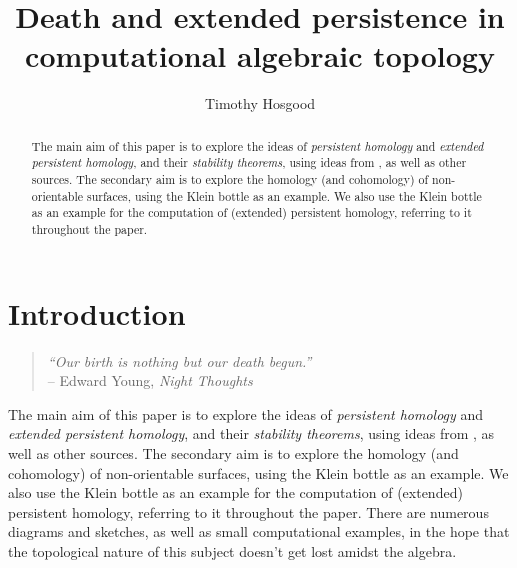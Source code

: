 \documentclass[12pt]{article}
\title{\vspace{-1em}Death and extended persistence in computational algebraic topology}
\author{Timothy Hosgood}
\numberwithin{equation}{subsection}
\numberwithin{theorem}{subsection}
\numberwithin{lemma}{subsection}
\numberwithin{corollary}{subsection}
\numberwithin{definition}{subsection}
\numberwithin{example}{subsection}
\numberwithin{note}{subsection}
\begin{document}

    \maketitle

    \begin{abstract}
        \small
        The main aim of this paper is to explore the ideas of \emph{persistent homology} and \emph{extended persistent homology}, and their \emph{stability theorems}, using ideas from \cite{CohenSteiner:2009ho,CohenSteiner:2007is,Bubenik:dn}, as well as other sources.
        The secondary aim is to explore the homology (and cohomology) of non-orientable surfaces, using the Klein bottle as an example.
        We also use the Klein bottle as an example for the computation of (extended) persistent homology, referring to it throughout the paper.
    \end{abstract}
    
    \renewcommand{\abstractname}{Contents}
    \begin{abstract}
        \noindent\vspace{-2em}\tableofcontents
    \end{abstract}

    \section{Introduction} %
    \label{sec:introduction}

        \begin{quotation}
            \raggedleft
            \emph{``Our birth is nothing but our death begun.''}\\
            -- Edward Young, \emph{Night Thoughts}
        \end{quotation}

        The main aim of this paper is to explore the ideas of \emph{persistent homology} and \emph{extended persistent homology}, and their \emph{stability theorems}, using ideas from \cite{CohenSteiner:2009ho,CohenSteiner:2007is,Bubenik:dn}, as well as other sources.
        The secondary aim is to explore the homology (and cohomology) of non-orientable surfaces, using the Klein bottle as an example.
        We also use the Klein bottle as an example for the computation of (extended) persistent homology, referring to it throughout the paper.
        There are numerous diagrams and sketches, as well as small computational examples, in the hope that the topological nature of this subject doesn't get lost amidst the algebra.
\end{document}

